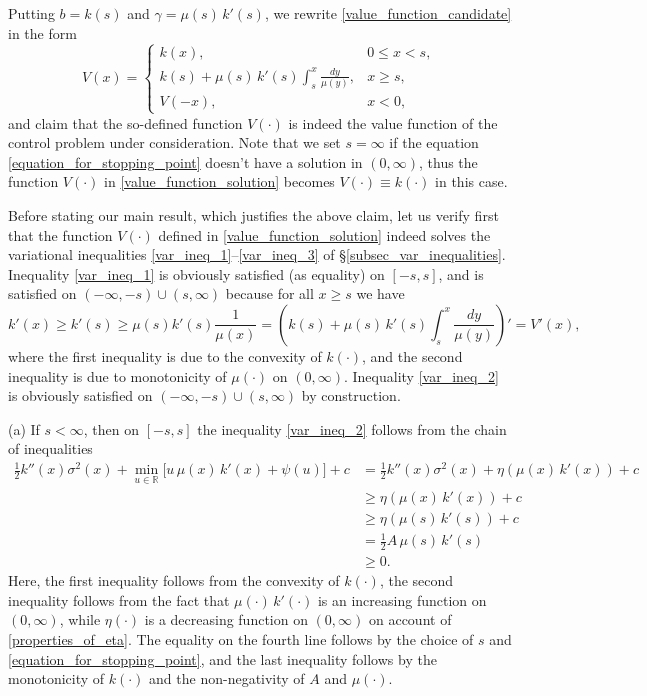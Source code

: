 \documentclass[11pt,tbtags,reqno]{article}
\theoremstyle{definition}
\numberwithin{equation}{section}
\theoremstyle{definition}
\begin{document}
Putting $b = k(s)$ and $\gamma = \mu(s) \, k'(s)$, we rewrite \eqref{value_function_candidate} in the form
\begin{equation}\label{value_function_solution}
    V(x) = 
    \begin{cases}
        k(x),  & 0 \leq x < s, \\
        k(s) + \mu(s) \, k'(s) \int_s^x \frac{dy}{\mu(y)}, & x \ge s, \\
        V(-x),  & x<0,
    \end{cases}
\end{equation}
and claim that the so-defined function $V(\cdot)$ is indeed the value function of the control problem under consideration. 
Note that we set $s = \infty$ if the equation \eqref{equation_for_stopping_point} doesn't have a solution in $(0, \infty)$, thus the function $V(\cdot)$ in \eqref{value_function_solution} becomes $V(\cdot) \equiv k(\cdot)$ in this case.

Before stating our main result, which justifies the above claim, let us verify first that the function $V(\cdot)$ defined in \eqref{value_function_solution} indeed solves the variational inequalities \ref{var_ineq_1}--\ref{var_ineq_3} of \S \ref{subsec_var_inequalities}. Inequality \ref{var_ineq_1} is obviously satisfied (as equality) on $[-s, s]$, and is satisfied on $(-\infty, -s) \cup (s, \infty)$ because for all $x \ge s$ we have
$$
k'(x) \ge k'(s) \ge \mu(s) k'(s) \frac{1}{\mu(x)} = \left(k(s)+ \mu(s) \, k'(s) \int_s^x \frac{dy}{\mu(y)}\right)' = V'(x),
$$
where the first inequality is due to the convexity of $k(\cdot)$, and the second inequality is due to monotonicity of $\mu(\cdot)$ on $(0, \infty)$. 
Inequality \ref{var_ineq_2} is obviously satisfied on $(-\infty, -s) \cup (s, \infty)$ by construction. 

(a) If $s < \infty$, then on $[-s, s]$ the inequality \ref{var_ineq_2} follows from the chain of inequalities
\begin{equation}
\begin{split}
    \frac{1}{2}k''(x)\sigma^2(x) + \min\limits_{u \in \mathbb{R}}\Big[ u \,\mu(x)\, k'(x) + \psi(u) \Big] + c &=
    \frac{1}{2}k''(x)\sigma^2(x) + \eta(\mu(x)\, k'(x)) + c \\
    &\ge
    \eta(\mu(x)\, k'(x)) + c \\
    &\ge
    \eta(\mu(s)\, k'(s)) + c \\
    &= \frac{1}{2}A\, \mu(s)\, k'(s) \\
    &\ge 0.
\end{split}
\end{equation}
Here, the first inequality follows from the convexity of $k(\cdot)$, the second inequality follows from the fact that  $\mu(\cdot)\, k'(\cdot)$ is an increasing function on $(0, \infty)$, while $\eta(\cdot)$ is a decreasing function on $(0, \infty)$ on account of \eqref{properties_of_eta}. The equality on the fourth line follows by the choice of $s$ and \eqref{equation_for_stopping_point}, and the last inequality follows by the monotonicity of $k(\cdot)$ and the non-negativity of $A$ and $\mu(\cdot)$. 
\end{document}
